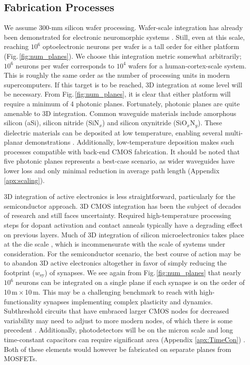 \documentclass[twocolumn]{article}
\begin{document}
\subsection{Fabrication Processes}
\label{sec:fabrication}
We assume 300-mm silicon wafer processing. Wafer-scale integration has already been demonstrated for electronic neuromorphic systems \cite{schemmel2010wafer}. Still, even at this scale, reaching $10^6$ optoelectronic neurons per wafer is a tall order for either platform (Fig.\,\ref{fig:num_planes}). We choose this integration metric somewhat arbitrarily; $10^6$ neurons per wafer corresponds to $10^4$ wafers for a human-cortex-scale system. This is roughly the same order as the number of processing units in modern supercomputers. If this target is to be reached, 3D integration at some level will be necessary. From Fig.\,\ref{fig:num_planes}, it is clear that either platform will require a minimum of 4 photonic planes. Fortunately, photonic planes are quite amenable to 3D integration. Common waveguide materials include amorphous silicon (aSi), silicon nitride (SiN$_x$) and silicon oxynitride (SiO$_x$N$_y$). These dielectric materials can be deposited at low temperature, enabling several multi-planar demonstrations \cite{shpa2015,sahu2015,chbu2017,zhli2018}. Additionally, low-temperature deposition makes such processes compatible with back-end CMOS fabrication. It should be noted that five photonic planes represents a best-case scenario, as wider waveguides have lower loss and only minimal reduction in average path length (Appendix \ref{apx:scaling}).

3D integration of active electronics is less straightforward, particularly for the semiconductor approach. 3D CMOS integration has been the subject of decades of research \cite{ro1983,knan2008,saan2008,viba2011,zhxi2015,li2013,elfe2016,lish2017} and still faces uncertainty. Required high-temperature processing steps for dopant activation and contact anneals typically have a degrading effect on previous layers. Much of 3D integration of silicon microelectronics takes place at the die scale \cite{elfe2016}, which is incommensurate with the scale of systems under consideration. For the semiconductor scenario, the best course of action may be to abandon 3D active electronics altogether in favor of simply reducing the footprint ($w_{\mathrm{sy}}$) of synapses. We see again from Fig.\,\ref{fig:num_planes} that nearly $10^6$ neurons can be integrated on a single plane if each synapse is on the order of 10\,\textmu m\,$\times$\,10\,\textmu m. This may be a challenging benchmark to reach with high-functionality synapses implementing complex plasticity and dynamics. Subthreshold circuits that have embraced larger CMOS nodes for decreased variability may need to adjust to more modern nodes, of which there is some precedent \cite{rupa2019}. Additionally, photodetectors will be on the micron scale and long time-constant capacitors can require significant area (Appendix \ref{apx:TimeCon}) \cite{indiveri2019importance}. Both of these elements would however be fabricated on separate planes from MOSFETs.
\end{document}
